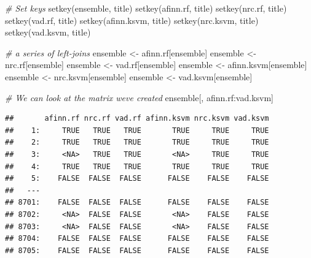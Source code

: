 \documentclass[
]{article}
\newenvironment{Shaded}{\begin{snugshade}}{\end{snugshade}}
\newcommand{\CommentTok}[1]{\textcolor[rgb]{0.56,0.35,0.01}{\textit{#1}}}
\newcommand{\FunctionTok}[1]{\textcolor[rgb]{0.00,0.00,0.00}{#1}}
\newcommand{\NormalTok}[1]{#1}
\newcommand{\OtherTok}[1]{\textcolor[rgb]{0.56,0.35,0.01}{#1}}
\newcommand{\SpecialCharTok}[1]{\textcolor[rgb]{0.00,0.00,0.00}{#1}}
\begin{document}
\begin{Shaded}
\begin{Highlighting}[]
\CommentTok{\# Set keys}
\FunctionTok{setkey}\NormalTok{(ensemble, title)}
\FunctionTok{setkey}\NormalTok{(afinn.rf, title)}
\FunctionTok{setkey}\NormalTok{(nrc.rf, title)}
\FunctionTok{setkey}\NormalTok{(vad.rf, title)}
\FunctionTok{setkey}\NormalTok{(afinn.ksvm, title)}
\FunctionTok{setkey}\NormalTok{(nrc.ksvm, title)}
\FunctionTok{setkey}\NormalTok{(vad.ksvm, title)}

\CommentTok{\# a series of left{-}joins}
\NormalTok{ensemble }\OtherTok{\textless{}{-}}\NormalTok{ afinn.rf[ensemble]}
\NormalTok{ensemble }\OtherTok{\textless{}{-}}\NormalTok{ nrc.rf[ensemble]}
\NormalTok{ensemble }\OtherTok{\textless{}{-}}\NormalTok{ vad.rf[ensemble]}
\NormalTok{ensemble }\OtherTok{\textless{}{-}}\NormalTok{ afinn.ksvm[ensemble]}
\NormalTok{ensemble }\OtherTok{\textless{}{-}}\NormalTok{ nrc.ksvm[ensemble]}
\NormalTok{ensemble }\OtherTok{\textless{}{-}}\NormalTok{ vad.ksvm[ensemble]}

\CommentTok{\# We can look at the matrix we\textquotesingle{}ve created}
\NormalTok{ensemble[, afinn.rf}\SpecialCharTok{:}\NormalTok{vad.ksvm]}
\end{Highlighting}
\end{Shaded}

\begin{verbatim}
##       afinn.rf nrc.rf vad.rf afinn.ksvm nrc.ksvm vad.ksvm
##    1:     TRUE   TRUE   TRUE       TRUE     TRUE     TRUE
##    2:     TRUE   TRUE   TRUE       TRUE     TRUE     TRUE
##    3:     <NA>   TRUE   TRUE       <NA>     TRUE     TRUE
##    4:     TRUE   TRUE   TRUE       TRUE     TRUE     TRUE
##    5:    FALSE  FALSE  FALSE      FALSE    FALSE    FALSE
##   ---                                                    
## 8701:    FALSE  FALSE  FALSE      FALSE    FALSE    FALSE
## 8702:     <NA>  FALSE  FALSE       <NA>    FALSE    FALSE
## 8703:     <NA>  FALSE  FALSE       <NA>    FALSE    FALSE
## 8704:    FALSE  FALSE  FALSE      FALSE    FALSE    FALSE
## 8705:    FALSE  FALSE  FALSE      FALSE    FALSE    FALSE
\end{verbatim}
\end{document}
